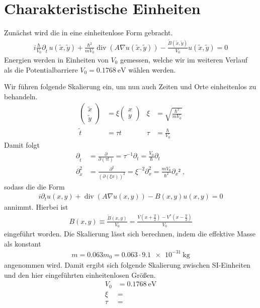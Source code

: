 \section{Charakteristische Einheiten}
Zunächst wird die  \lvn in eine einheitenlose Form gebracht.
\begin{align}
    i\frac{\hbar}{V_0}\partial_{\tilde{t}}\, u(\tilde{x},\tilde{y})+\frac{\hbar^2}{mV_0}\operatorname{div}(A\nabla u(\tilde{x},\tilde{y})) - \frac{\tilde{B}(\tilde{x},\tilde{y})}{V_0} u(\tilde{x},\tilde{y}) = 0
\end{align}
Energien werden in Einheiten von $V_0$ gemessen, welche wir im weiteren Verlauf als die Potentialbarriere $V_0 = \SI{0.1768}{\electronvolt}$ wählen werden.

Wir führen folgende Skalierung ein, um nun auch Zeiten und Orte einheitenlos zu behandeln.
\begin{align}
  \left(\begin{array}{c}\tilde{x}\\\tilde{y}\end{array}\right) &= \xi \left(\begin{array}{c}x\\y\end{array}\right)   & \xi &= \sqrt{\frac{\hbar^2}{mV_0}} \\
  \tilde{t} &= \tau t   & \tau &= \frac{\hbar}{V_0}
\end{align}
Damit folgt
\begin{align}
  \partial_{\tilde{t}} &= \frac{\partial}{\partial (\tau t)} = \tau^{-1} \partial_t = \frac{V_0}{\hbar} \partial_t \\
  \partial_{\tilde{x}}^2 &= \frac{\partial^2}{(\partial (\xi x))^2} = \xi^{-2} \partial_x^2 = \frac{mV_0}{\hbar^2} \partial_x² \; ,
\end{align}
sodass die \lvn die Form
\begin{align}
  i \partial_t u(x,y)+\operatorname{div}(A\nabla u(x,y)) - B(x,y) u(x,y) = 0
  \label{eq:lvn}
\end{align}
annimmt. Hierbei ist
\begin{align}
  B(x,y) \equiv \frac{\tilde{B}(x,y)}{V_0} = \frac{V\left(x+\frac{y}{2}\right) - V^*\left(x-\frac{y}{2}\right)}{V_0}
\end{align}
eingeführt worden. Die Skalierung lässt sich berechnen, indem die effektive Masse als konstant
\begin{align}
  m = 0.063 m_0 =  0.063\cdot\SI{9.1e-31}{\kilogram}
\end{align}
angenommen wird. Damit ergibt sich folgende Skalierung zwischen SI-Einheiten und den hier eingeführten einheitenlosen Größen.
\begin{align}
  V_0 &= \SI{0.1768}{\electronvolt} \\
  \xi &=  \\
  \tau &= 
\end{align}

